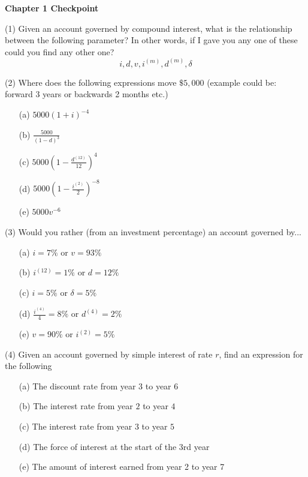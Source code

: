 \documentclass[12pt]{article}
\begin{document}
\begin{center}
\begin{Large}
\textbf{Chapter 1 Checkpoint}
\end{Large}
\end{center}

\vspace{1cm}

(1) Given an account governed by compound interest, what is the relationship between the following parameter? In other words, if I gave you any one of these could you find any other one? \[i, d, v, i^{(m)}, d^{(m)}, \delta\]


\vspace{1cm}


(2) Where does the following expressions move $\$5,000$ (example could be: forward 3 years or backwards 2 months etc.)

\begin{enumerate}
    \item[(a)] $5000 (1+i)^{-4}$
    \item[(b)] $\frac{5000}{(1-d)^3}$
    \item[(c)] $5000(1-\frac{d^{(12)}}{12})^4$
    \item[(d)] $5000(1-\frac{i^{(2)}}{2})^{-8}$
    \item[(e)] $5000v^{-6}$ 
\end{enumerate}

\vspace{1cm}

(3) Would you rather (from an investment percentage) an account governed by...

\begin{enumerate}
    \item[(a)] $i=7\%$ or $v=93\%$
    \item[(b)] $i^{(12)}=1\%$ or $d=12\%$
    \item[(c)] $i=5\%$ or $\delta=5\%$
    \item[(d)] $\frac{i^{(4)}}{4}=8\%$ or $d^{(4)}=2\%$
    \item[(e)] $v=90\%$ or $i^{(2)}=5\%$
\end{enumerate}


\vspace{1cm}

(4) Given an account governed by simple interest of rate $r$, find an expression for the following

\begin{enumerate}
    \item[(a)] The discount rate from year $3$ to year $6$
    \item[(b)] The interest rate from year $2$ to year $4$ 
    \item[(c)] The interest rate from year $3$ to year $5$
    \item[(d)] The force of interest at the start of the 3rd year
    \item[(e)] The amount of interest earned from year 2 to year 7
\end{enumerate}
\end{document}
